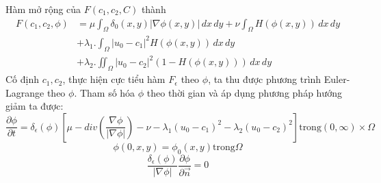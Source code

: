 \documentclass[12pt,oneside,a4]{report}
\begin{document}
 Hàm mở rộng của $F(c_1,c_2,C)$ thành
\begin{equation}
\begin{split}
F(c_1, c_2, \phi)&=\mu \int_{\Omega}\delta_0(x,y)|\nabla \phi(x,y)|\,dx\,dy+\nu  \int_{\Omega}H( \phi(x,y))\,dx\,dy \\ 
&+\lambda_1 .\int_{\Omega} |u_0-c_1|^2H(\phi(x,y)) \,dx\,dy\\&+\lambda_2 .\iint_{\Omega} |u_0-c_2|^2(1-H(\phi(x,y))) \,dx\,dy
\end{split}
\end{equation}
Cố định $c_1, c_2$, thực hiện cực tiểu hàm $F_{\epsilon}$ theo $\phi$, ta thu được phương trình Euler-Lagrange theo $\phi$. Tham số hóa $\phi$ theo thời gian và áp dụng phương pháp hướng giảm ta được:
\begin{equation}
\dfrac{\partial \phi}{\partial t}= \delta_{\epsilon}(\phi)[\mu- div(\dfrac{\nabla \phi}{|\nabla \phi|})- \nu- \lambda_1 (u_0-c_1)^2-\lambda_2 (u_0-c_2)^2]  \text{trong} (0,\infty)\times \Omega
\end{equation}
\begin{equation}
\phi(0,x,y)=\phi_0(x,y) \text{trong} \Omega 
\end{equation}
\begin{equation}
\dfrac{\delta_{\epsilon}(\phi)}{|\nabla \phi|}\dfrac{\partial \phi}{\partial \vec{n}}=0
\end{equation}
\end{document}

